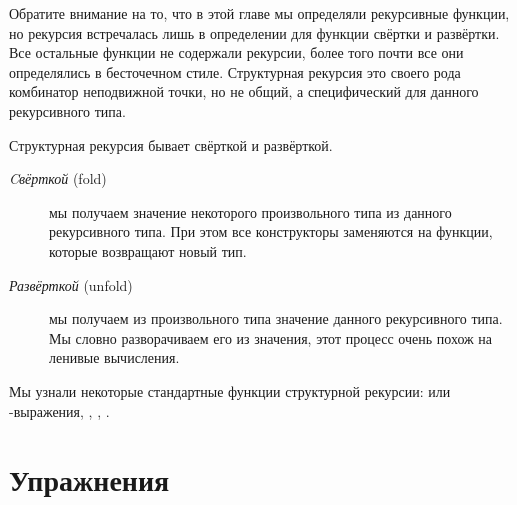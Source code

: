 Обратите внимание на то, что в этой главе мы определяли рекурсивные
функции, но рекурсия встречалась лишь в определении для функции свёртки
и развёртки. Все остальные функции не содержали рекурсии, более того
почти все они определялись в бесточечном стиле. Структурная рекурсия это
своего рода комбинатор неподвижной точки, но не общий, а специфический
для данного рекурсивного типа.

Структурная рекурсия бывает свёрткой и развёрткой.

\begin{description}
\item[\emph{Cвёрткой} (fold)]
мы получаем значение некоторого произвольного типа из данного
рекурсивного типа. При этом все конструкторы заменяются на функции,
которые возвращают новый тип.
\item[\emph{Развёрткой} (unfold)]
мы получаем из произвольного типа значение данного рекурсивного типа. Мы
словно разворачиваем его из значения, этот процесс очень похож на
ленивые вычисления.
\end{description}

Мы узнали некоторые стандартные функции структурной рекурсии: 
или -выражения, , , .

\section{Упражнения}

